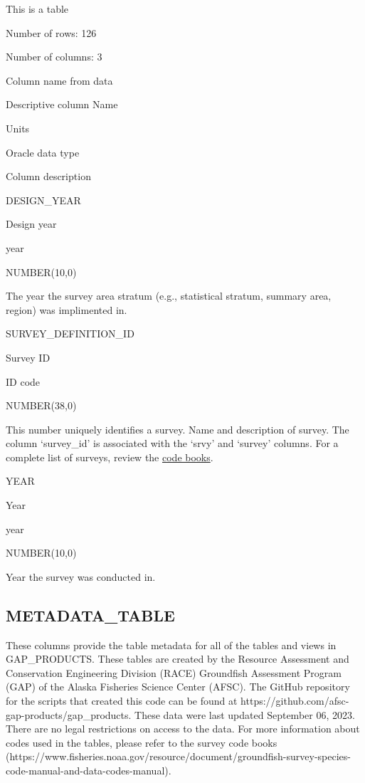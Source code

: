 \documentclass[
  letterpaper,
  oneside,
  open=any]{scrbook}
\begin{document}
This is a table

Number of rows: 126

Number of columns: 3

Column name from data

Descriptive column Name

Units

Oracle data type

Column description

DESIGN\_YEAR

Design year

year

NUMBER(10,0)

The year the survey area stratum (e.g., statistical stratum, summary
area, region) was implimented in.

SURVEY\_DEFINITION\_ID

Survey ID

ID code

NUMBER(38,0)

This number uniquely identifies a survey. Name and description of
survey. The column `survey\_id' is associated with the `srvy' and
`survey' columns. For a complete list of surveys, review the
\href{https://www.fisheries.noaa.gov/resource/document/groundfish-survey-species-code-manual-and-data-codes-manual}{code
books}.

YEAR

Year

year

NUMBER(10,0)

Year the survey was conducted in.

\hypertarget{metadata_table}{%
\subsection{METADATA\_TABLE}\label{metadata_table}}

These columns provide the table metadata for all of the tables and views
in GAP\_PRODUCTS. These tables are created by the Resource Assessment
and Conservation Engineering Division (RACE) Groundfish Assessment
Program (GAP) of the Alaska Fisheries Science Center (AFSC). The GitHub
repository for the scripts that created this code can be found at
https://github.com/afsc-gap-products/gap\_products. These data were last
updated September 06, 2023. There are no legal restrictions on access to
the data. For more information about codes used in the tables, please
refer to the survey code books
(https://www.fisheries.noaa.gov/resource/document/groundfish-survey-species-code-manual-and-data-codes-manual).
\end{document}
